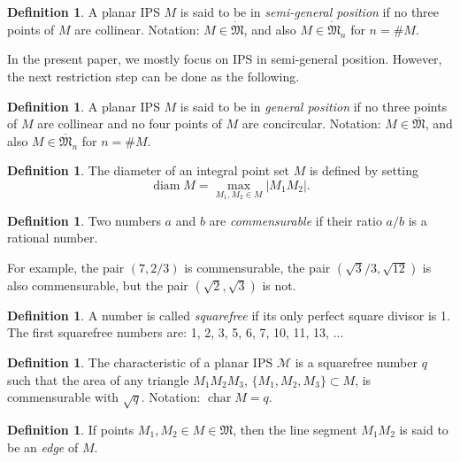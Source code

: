 \documentclass[a4paper,14pt]{article} %
\theoremstyle{plain}
\theoremstyle{definition}
\newtheorem{definition}[theorem]{Definition}
\DeclareMathOperator{\chr}{char}
\begin{document}
\begin{definition}
	\label{def:IPS_semi_general}
	A planar IPS $M$ is said to be in \emph{semi-general position}
	if no three points of $M$ are collinear.
	Notation: $M\in\dot{\mathfrak{M}}$, and also $M\in\dot{\mathfrak{M}}_n$ for $n=\#M$.
\end{definition}

In the present paper, we mostly focus on IPS in semi-general position.
However, the next restriction step can be done as the following.

\begin{definition}
	\label{def:IPS_general}
	A planar IPS $M$ is said to be in \emph{general position}
	if no three points of $M$ are collinear
	and no four points of $M$ are concircular.
	Notation: $M\in\overline{\mathfrak{M}}$, and also $M\in\overline{\mathfrak{M}}_n$ for $n=\#M$.
\end{definition}

\begin{definition}
	The diameter of an integral point set $M$ is defined by setting
	\begin{equation}
		\operatorname{diam} M = \underset{M_{1}, M_{2} \in
		M}{\max} |M_{1}M_{2}|
		.
	\end{equation}
\end{definition}

\begin{definition}
	Two numbers $a$ and $b$ are \emph{commensurable} if their ratio $a/b$
	is a rational number.
\end{definition}

For example, the pair $(7, 2/3)$ is commensurable,
the pair $(\sqrt3/3, \sqrt{12})$ is also commensurable,
but the pair $(\sqrt2, \sqrt3)$ is not.

\begin{definition}
	A number is called \emph{squarefree} if its only perfect square divisor is 1.
	The first squarefree numbers are: 1, 2, 3, 5, 6, 7, 10, 11, 13, ...
\end{definition}


\begin{definition}
	\label{def:char}
	The characteristic of a planar IPS $\mathcal{M}$ is a squarefree number $q$
	such that the area of any triangle $M_1M_2M_3$, $\{M_1,M_2,M_3\}\subset M$,
	is commensurable with $\sqrt{q}$.
	Notation: $\chr M = q$.
\end{definition}

\begin{definition}
	If points $M_1, M_2 \in M \in \mathfrak{M}$,
	then the line segment $M_1 M_2$ is said to be an \emph{edge} of $M$.
\end{definition}
\end{document}
